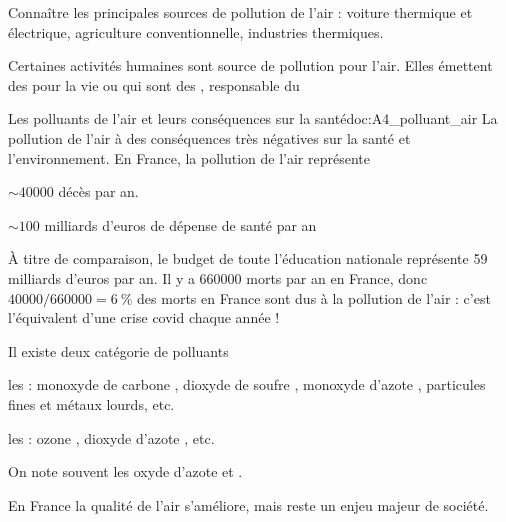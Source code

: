 \teteTermStssEnvi
{}

\begin{objectifs}
  \item Connaître les principales sources de pollution de l'air : voiture thermique et électrique, agriculture conventionnelle, industries thermiques.
\end{objectifs}

\begin{contexte}
  Certaines activités humaines sont source de pollution pour l'air.
  Elles émettent des  pour la vie ou qui sont des , responsable du 
  
\end{contexte}


\begin{doc}{Les polluants de l'air et leurs conséquences sur la santé}{doc:A4_polluant_air}
  La pollution de l'air à des conséquences très négatives sur la santé et l'environnement.
  En France, la pollution de l'air représente
  \begin{listePoints}
    \item $\sim \num{40000}$ décès par an.
    \item $\sim 100$ milliards d'euros de dépense de santé par an 
  \end{listePoints}
  À titre de comparaison, le budget de toute l'éducation nationale représente 59 milliards d'euros par an. 
  Il y a \num{660 000} morts par an en France, donc $\num{40000}/\num{660000} = \qty{6}{\percent}$ des morts en France sont dus à la pollution de l'air : c'est l'équivalent d'une crise covid chaque année !

  \begin{importants}
    Il existe deux catégorie de polluants
    \begin{listePoints}
      \item les  : monoxyde de carbone , dioxyde de soufre , monoxyde d'azote , particules fines et métaux lourds, etc.
      \item les  : ozone , dioxyde d'azote , etc.
    \end{listePoints}
    On note souvent  les oxyde d'azote  et .
  \end{importants}
  
  En France la qualité de l'air s'améliore, mais reste un enjeu majeur de société.

  \begin{center}
  \end{center}
\end{doc}


